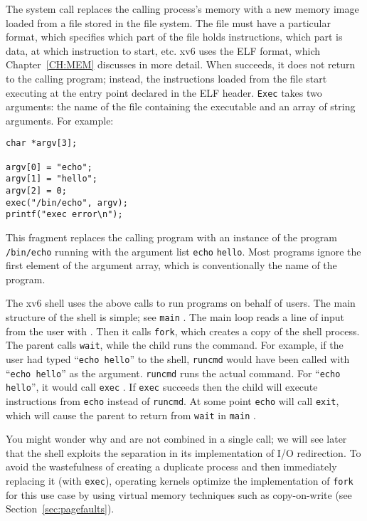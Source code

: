 The
system call
replaces the calling process's memory with a new memory
image loaded from a file stored in the file system.
The file must have a particular format, which specifies which part of
the file holds instructions, which part is data, at which instruction
to start, etc. xv6
uses the ELF format, which Chapter~\ref{CH:MEM} discusses in
more detail.
When
succeeds, it does not return to the calling program;
instead, the instructions loaded from the file start
executing at the entry point declared in the ELF header.
\lstinline{Exec}
takes two arguments: the name of the file containing the
executable and an array of string arguments.
For example:
\begin{lstlisting}[]
char *argv[3];

argv[0] = "echo";
argv[1] = "hello";
argv[2] = 0;
exec("/bin/echo", argv);
printf("exec error\n");
\end{lstlisting}
This fragment replaces the calling program with an instance
of the program 
\lstinline{/bin/echo}
running with the argument list
\lstinline{echo}
\lstinline{hello}.
Most programs ignore the first element of the argument array, which is 
conventionally the name of the program.

The xv6 shell uses the above calls to run programs on behalf of
users. The main structure of the shell is simple; see
\lstinline{main} 
.
The main loop reads a line of input from the user with
.
Then it calls 
\lstinline{fork}, 
which creates a copy of the shell process. The
parent calls
\lstinline{wait},
while the child runs the command.  For example, if the user
had typed
``\lstinline{echo hello}''
to the shell,
\lstinline{runcmd}
would have been called with
``\lstinline{echo hello}''
as the argument.
\lstinline{runcmd} 
runs the actual command. For
``\lstinline{echo hello}'',
it would call
\lstinline{exec} 
.
If
\lstinline{exec}
succeeds then the child will execute instructions from
\lstinline{echo}
instead of
\lstinline{runcmd}.  
At some point
\lstinline{echo}
will call
\lstinline{exit},
which will cause the parent to return from
\lstinline{wait}
in 
\lstinline{main}
.

You might wonder why
and
are not combined in a single call; we will see later that 
the shell exploits the separation in its implementation of
I/O redirection.
To avoid the wastefulness of
creating a duplicate process and then immediately replacing it (with \lstinline{exec}),
operating kernels optimize the implementation of
\lstinline{fork}
for this use case by using virtual memory techniques such as
copy-on-write (see Section~\ref{sec:pagefaults}).

